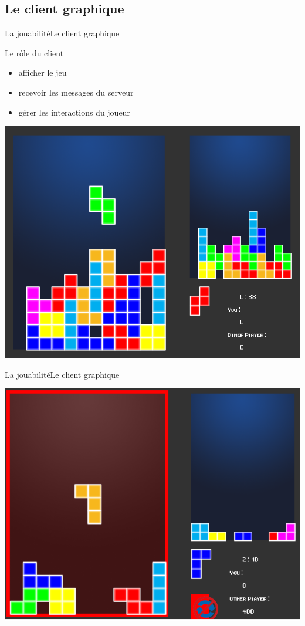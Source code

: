 \documentclass[french]{beamer}
\begin{document}
	\subsection{Le client graphique}

		\begin{frame}{La jouabilité}{Le client graphique}
			\begin{block}{Le rôle du client}
				\begin{itemize}
					\item afficher le jeu
					\item recevoir les messages du serveur
					\item gérer les interactions du joueur
				\end{itemize}
			\end{block}
			\begin{center}
				\includegraphics[scale=0.175]{img/vouitris.png}
			\end{center}
		\end{frame}

		\begin{frame}{La jouabilité}{Le client graphique}
			\begin{center}
				\includegraphics[scale=0.25]{img/bla.png}
			\end{center}
		\end{frame}
\end{document}
